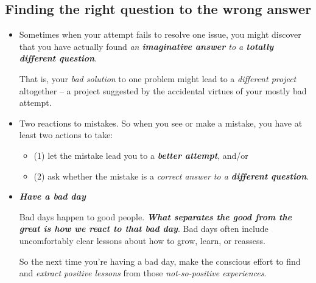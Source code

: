 \documentclass[11pt]{article}
\begin{document}
\subsection{Finding the right question to the wrong answer}
\begin{itemize}
\item Sometimes when your attempt fails to resolve one issue, you might discover that you have actually found \emph{an \textbf{imaginative answer} to a \textbf{totally different question}}.

That is, your \emph{bad solution} to one problem might lead to a \emph{different project} altogether -- a project suggested by the accidental virtues of your mostly bad attempt.

\item Two reactions to mistakes. So when you see or make a mistake, you have at least two actions to take: 
\begin{itemize}
\item (1) let the mistake lead you to a \emph{\textbf{better attempt}}, and/or
\item (2) ask whether the mistake is a \emph{correct answer to a \textbf{different question}}.
\end{itemize}
 

\item \emph{\textbf{Have a bad day}}

Bad days happen to good people. \emph{\textbf{What separates the good from the great is how we react to that bad day}}. Bad days often include uncomfortably clear lessons about how to grow, learn, or reassess. 

So the next time you’re having a bad day, make the conscious effort to find and \emph{extract positive lessons} from those \emph{not-so-positive experiences}.
\end{itemize}
\end{document}
